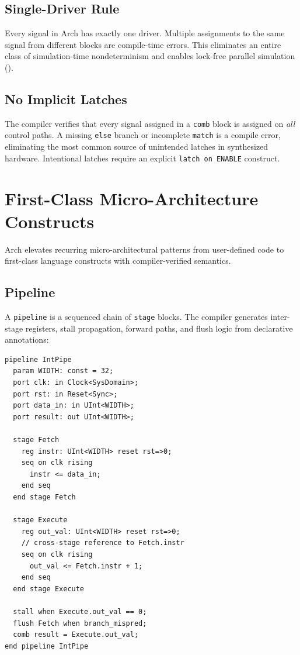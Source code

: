 \documentclass[11pt,twocolumn]{article}
\begin{document}
\subsection{Single-Driver Rule}

Every signal in Arch has exactly one driver. Multiple assignments to the same signal from different blocks are compile-time errors. This eliminates an entire class of simulation-time nondeterminism and enables lock-free parallel simulation ().

\subsection{No Implicit Latches}

The compiler verifies that every signal assigned in a \texttt{comb} block is assigned on \emph{all} control paths. A missing \texttt{else} branch or incomplete \texttt{match} is a compile error, eliminating the most common source of unintended latches in synthesized hardware. Intentional latches require an explicit \texttt{latch on ENABLE} construct.

\section{First-Class Micro-Architecture Constructs}\label{sec:constructs}

Arch elevates recurring micro-architectural patterns from user-defined code to first-class language constructs with compiler-verified semantics.

\subsection{Pipeline}

A \texttt{pipeline} is a sequenced chain of \texttt{stage} blocks. The compiler generates inter-stage registers, stall propagation, forward paths, and flush logic from declarative annotations:

\begin{lstlisting}[language=Arch,caption={Pipeline with forwarding},label={lst:pipe}]
pipeline IntPipe
  param WIDTH: const = 32;
  port clk: in Clock<SysDomain>;
  port rst: in Reset<Sync>;
  port data_in: in UInt<WIDTH>;
  port result: out UInt<WIDTH>;

  stage Fetch
    reg instr: UInt<WIDTH> reset rst=>0;
    seq on clk rising
      instr <= data_in;
    end seq
  end stage Fetch

  stage Execute
    reg out_val: UInt<WIDTH> reset rst=>0;
    // cross-stage reference to Fetch.instr
    seq on clk rising
      out_val <= Fetch.instr + 1;
    end seq
  end stage Execute

  stall when Execute.out_val == 0;
  flush Fetch when branch_mispred;
  comb result = Execute.out_val;
end pipeline IntPipe
\end{lstlisting}
\end{document}
